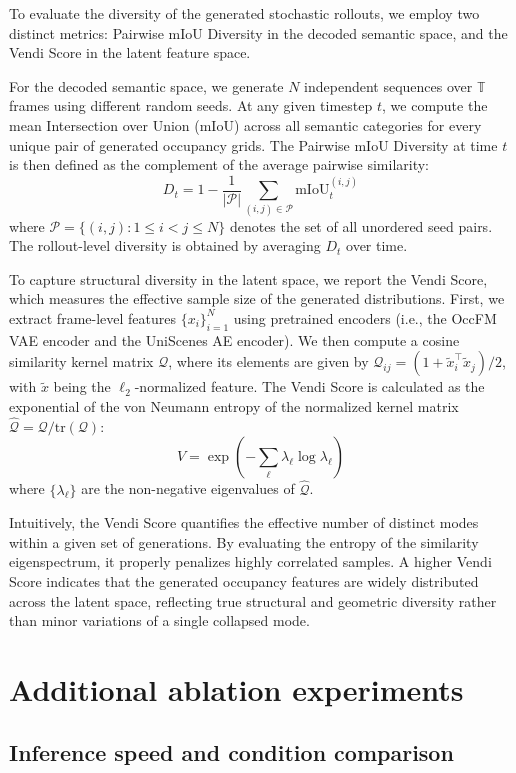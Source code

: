 To evaluate the diversity of the generated stochastic rollouts, we employ two distinct metrics: Pairwise mIoU Diversity in the decoded semantic space, and the Vendi Score \cite{friedman2022vendi} in the latent feature space. 

For the decoded semantic space, we generate $N$ independent sequences over $\mathbb{T}$ frames using different random seeds. At any given timestep $t$, we compute the mean Intersection over Union ($\text{mIoU}$) across all semantic categories for every unique pair of generated occupancy grids. The Pairwise mIoU Diversity at time $t$ is then defined as the complement of the average pairwise similarity:
$$D_t = 1 - \frac{1}{|\mathcal{P}|}\sum_{(i,j)\in\mathcal{P}} \text{mIoU}_{t}^{(i,j)}$$
where $\mathcal{P} = \{(i,j) : 1 \le i < j \le N\}$ denotes the set of all unordered seed pairs. The rollout-level diversity is obtained by averaging $D_t$ over time.

To capture structural diversity in the latent space, we report the Vendi Score, which measures the effective sample size of the generated distributions. First, we extract frame-level features $\{x_i\}_{i=1}^N$ using pretrained encoders (i.e., the OccFM VAE encoder and the UniScenes AE encoder). We then compute a cosine similarity kernel matrix $\mathcal{Q}$, where its elements are given by $\mathcal{Q}_{ij} = (1 + \tilde{x}_i^\top \tilde{x}_j)/2$, with $\tilde{x}$ being the $\ell_2$-normalized feature. The Vendi Score is calculated as the exponential of the von Neumann entropy of the normalized kernel matrix $\hat{\mathcal{Q}} = \mathcal{Q}/\text{tr}(\mathcal{Q})$:
$$V = \exp \left( -\sum_\ell \lambda_\ell \log \lambda_\ell \right)$$
where $\{\lambda_\ell\}$ are the non-negative eigenvalues of $\hat{\mathcal{Q}}$.

Intuitively, the Vendi Score quantifies the effective number of distinct modes within a given set of generations. By evaluating the entropy of the similarity eigenspectrum, it properly penalizes highly correlated samples. A higher Vendi Score indicates that the generated occupancy features are widely distributed across the latent space, reflecting true structural and geometric diversity rather than minor variations of a single collapsed mode.

\section{Additional ablation experiments}

\subsection{Inference speed and condition comparison}

